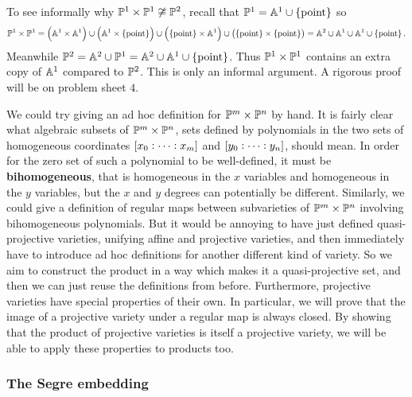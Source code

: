 \begin{example*}
To see informally why $ \PP^1 \times \PP^1 \not\cong \PP^2 $, recall that $ \PP^1 = \AA^1 \cup \cbr{\text{point}} $ so
$$ \PP^1 \times \PP^1 = \br{\AA^1 \times \AA^1} \cup \br{\AA^1 \times \cbr{\text{point}}} \cup \br{\cbr{\text{point}} \times \AA^1} \cup \br{\cbr{\text{point}} \times \cbr{\text{point}}} = \AA^2 \cup \AA^1 \cup \AA^1 \cup \cbr{\text{point}}. $$
Meanwhile $ \PP^2 = \AA^2 \cup \PP^1 = \AA^2 \cup \AA^1 \cup \cbr{\text{point}} $. Thus $ \PP^1 \times \PP^1 $ contains an extra copy of $ \AA^1 $ compared to $ \PP^2 $. This is only an informal argument. A rigorous proof will be on problem sheet $ 4 $.
\end{example*}

We could try giving an ad hoc definition for $ \PP^m \times \PP^n $ by hand. It is fairly clear what algebraic subsets of $ \PP^m \times \PP^n $, sets defined by polynomials in the two sets of homogeneous coordinates $ \sbr{x_0 : \dots : x_m} $ and $ \sbr{y_0 : \dots : y_n} $, should mean. In order for the zero set of such a polynomial to be well-defined, it must be \textbf{bihomogeneous}, that is homogeneous in the $ x $ variables and homogeneous in the $ y $ variables, but the $ x $ and $ y $ degrees can potentially be different. Similarly, we could give a definition of regular maps between subvarieties of $ \PP^m \times \PP^n $ involving bihomogeneous polynomials. But it would be annoying to have just defined quasi-projective varieties, unifying affine and projective varieties, and then immediately have to introduce ad hoc definitions for another different kind of variety. So we aim to construct the product in a way which makes it a quasi-projective set, and then we can just reuse the definitions from before. Furthermore, projective varieties have special properties of their own. In particular, we will prove that the image of a projective variety under a regular map is always closed. By showing that the product of projective varieties is itself a projective variety, we will be able to apply these properties to products too.

\pagebreak

\subsubsection{The Segre embedding}

